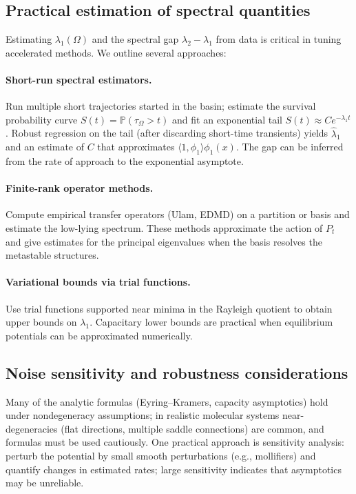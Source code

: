 \subsection{Practical estimation of spectral quantities}

Estimating $\lambda_1(\Omega)$ and the spectral gap $\lambda_2-\lambda_1$ from data is critical in tuning accelerated methods. We outline several approaches:

\paragraph{Short-run spectral estimators.}
Run multiple short trajectories started in the basin; estimate the survival probability curve $S(t)=\mathbb P(\tau_\Omega>t)$ and fit an exponential tail $S(t)\approx C e^{-\lambda_1 t}$. Robust regression on the tail (after discarding short-time transients) yields $\hat\lambda_1$ and an estimate of $C$ that approximates $\langle 1,\phi_1\rangle\phi_1(x)$. The gap can be inferred from the rate of approach to the exponential asymptote.

\paragraph{Finite-rank operator methods.}
Compute empirical transfer operators (Ulam, EDMD) on a partition or basis and estimate the low-lying spectrum. These methods approximate the action of $P_t$ and give estimates for the principal eigenvalues when the basis resolves the metastable structures.

\paragraph{Variational bounds via trial functions.}
Use trial functions supported near minima in the Rayleigh quotient to obtain upper bounds on $\lambda_1$. Capacitary lower bounds are practical when equilibrium potentials can be approximated numerically.

\subsection{Noise sensitivity and robustness considerations}

Many of the analytic formulas (Eyring--Kramers, capacity asymptotics) hold under nondegeneracy assumptions; in realistic molecular systems near-degeneracies (flat directions, multiple saddle connections) are common, and formulas must be used cautiously. One practical approach is sensitivity analysis: perturb the potential by small smooth perturbations (e.g., mollifiers) and quantify changes in estimated rates; large sensitivity indicates that asymptotics may be unreliable.

